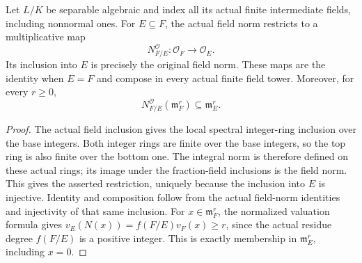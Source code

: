 \begin{lemma}
\label{fw:integral-finite-layer-norms}
\leanok
Let $L/K$ be separable algebraic and index all its actual finite
intermediate fields, including nonnormal ones. For $E\subseteq F$,
the actual field norm restricts to a multiplicative map
\[
 N^{\mathcal O}_{F/E}:\mathcal O_F\longrightarrow\mathcal O_E.
\]
Its inclusion into $E$ is precisely the original field norm.
These maps are the identity when $E=F$ and compose in every
actual finite field tower. Moreover, for every $r\geq0$,
\[
 N^{\mathcal O}_{F/E}(\mathfrak m_F^r)\subseteq\mathfrak m_E^r.
\]
\end{lemma}
\begin{proof}
The actual field inclusion gives the local spectral integer-ring
inclusion over the base integers. Both integer rings are finite
over the base integers, so the top ring is also finite over the
bottom one. The integral norm is therefore defined on these
actual rings; its image under the fraction-field inclusions is
the field norm. This gives the asserted restriction, uniquely
because the inclusion into $E$ is injective. Identity and
composition follow from the actual field-norm identities and
injectivity of that same inclusion. For $x\in\mathfrak m_F^r$,
the normalized valuation formula gives
$v_E(N(x))=f(F/E)v_F(x)\geq r$, since the actual residue degree
$f(F/E)$ is a positive integer. This is exactly membership in
$\mathfrak m_E^r$, including $x=0$.
\end{proof}

